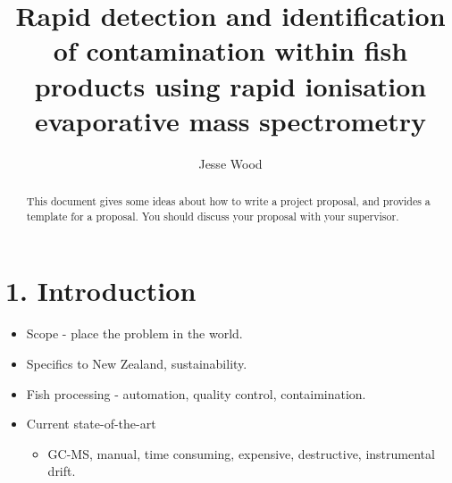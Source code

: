 \documentclass[11pt, a4paper, twoside, openright]{report}
\title{Rapid detection and identification of contamination within fish products using rapid ionisation evaporative mass spectrometry}
\author{Jesse Wood}
\date{}
\begin{document}
\frontmatter


\begin{abstract}
  This document gives some ideas about how to write a project
  proposal, and provides a template for a proposal. You should discuss
  your proposal with your supervisor.
\end{abstract}


\maketitle




\mainmatter


\section*{1. Introduction}





\begin{itemize}
  \item Scope - place the problem in the world. 
  \item Specifics to New Zealand, sustainability. 
  \item Fish processing - automation, quality control, contaimination. 
  \item Current state-of-the-art
  \begin{itemize}
    \item GC-MS, manual, time consuming, expensive, destructive, instrumental drift. 
  \end{itemize}
\end{itemize}
\end{document}
